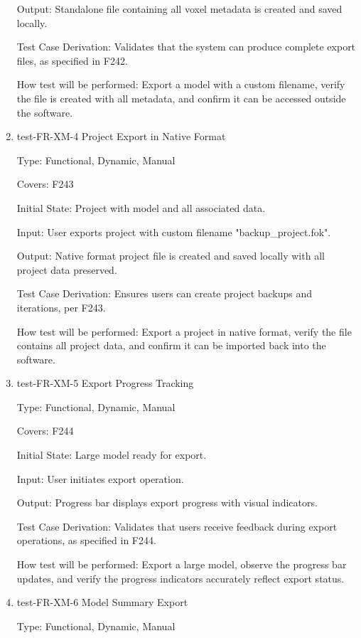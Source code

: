 \documentclass[12pt, titlepage]{article}
\begin{document}
\begin{enumerate}
Output: Standalone file containing all voxel metadata is created and saved locally.

Test Case Derivation: Validates that the system can produce complete export files, as specified in F242.
					
How test will be performed: Export a model with a custom filename, verify the file is created with all metadata, and confirm it can be accessed outside the software.

\item{test-FR-XM-4 Project Export in Native Format\\}

Type: Functional, Dynamic, Manual

Covers: F243
					
Initial State: Project with model and all associated data.
					
Input: User exports project with custom filename "backup\_project.fok".
					
Output: Native format project file is created and saved locally with all project data preserved.

Test Case Derivation: Ensures users can create project backups and iterations, per F243.
					
How test will be performed: Export a project in native format, verify the file contains all project data, and confirm it can be imported back into the software.

\item{test-FR-XM-5 Export Progress Tracking\\}

Type: Functional, Dynamic, Manual

Covers: F244
					
Initial State: Large model ready for export.
					
Input: User initiates export operation.
					
Output: Progress bar displays export progress with visual indicators.

Test Case Derivation: Validates that users receive feedback during export operations, as specified in F244.
					
How test will be performed: Export a large model, observe the progress bar updates, and verify the progress indicators accurately reflect export status.

\item{test-FR-XM-6 Model Summary Export\\}

Type: Functional, Dynamic, Manual


\end{enumerate}
\end{document}
